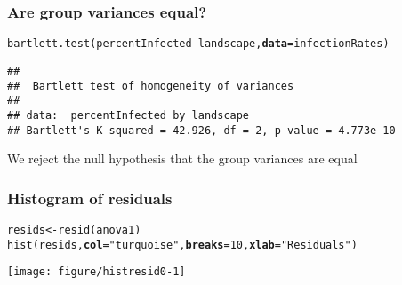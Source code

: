 \documentclass[color=usenames,dvipsnames]{beamer}\usepackage[]{graphicx}\usepackage[]{color}
\makeatletter
\newcommand{\hlnum}[1]{\textcolor[rgb]{0.69,0.494,0}{#1}}%
\newcommand{\hlstr}[1]{\textcolor[rgb]{0.749,0.012,0.012}{#1}}%
\newcommand{\hlopt}[1]{\textcolor[rgb]{0,0,0}{#1}}%
\newcommand{\hlstd}[1]{\textcolor[rgb]{0,0,0}{#1}}%
\newcommand{\hlkwb}[1]{\textcolor[rgb]{0,0.341,0.682}{#1}}%
\newcommand{\hlkwc}[1]{\textcolor[rgb]{0,0,0}{\textbf{#1}}}%
\newcommand{\hlkwd}[1]{\textcolor[rgb]{0.004,0.004,0.506}{#1}}%
\newenvironment{kframe}{%
 \def\at@end@of@kframe{}%
 \ifinner\ifhmode%
  \def\at@end@of@kframe{\end{minipage}}%
  \begin{minipage}{\columnwidth}%
 \fi\fi%
 \def\FrameCommand##1{\hskip\@totalleftmargin \hskip-\fboxsep
 \colorbox{shadecolor}{##1}\hskip-\fboxsep
     \hskip-\linewidth \hskip-\@totalleftmargin \hskip\columnwidth}%
 \MakeFramed {\advance\hsize-\width
   \@totalleftmargin\z@ \linewidth\hsize
   \@setminipage}}%
 {\par\unskip\endMakeFramed%
 \at@end@of@kframe}
\newenvironment{knitrout}{}{} %
\makeatother
\begin{document}
\begin{frame}[fragile]
  \frametitle{Are group variances equal?}
  \small
\begin{knitrout}\footnotesize
{}\color{fgcolor}\begin{kframe}
\begin{alltt}
\hlkwd{bartlett.test}\hlstd{(percentInfected}\hlopt{~}\hlstd{landscape,} \hlkwc{data}\hlstd{=infectionRates)}
\end{alltt}
\begin{verbatim}
## 
## 	Bartlett test of homogeneity of variances
## 
## data:  percentInfected by landscape
## Bartlett's K-squared = 42.926, df = 2, p-value = 4.773e-10
\end{verbatim}
\end{kframe}
\end{knitrout}
\vfill
{We reject the null hypothesis that the group variances are equal}
\end{frame}






\begin{frame}[fragile]
  \frametitle{Histogram of residuals}
\scriptsize
\begin{knitrout}
\color{fgcolor}\begin{kframe}
\begin{alltt}
\hlstd{resids} \hlkwb{<-} \hlkwd{resid}\hlstd{(anova1)}
\hlkwd{hist}\hlstd{(resids,} \hlkwc{col}\hlstd{=}\hlstr{"turquoise"}\hlstd{,} \hlkwc{breaks}\hlstd{=}\hlnum{10}\hlstd{,} \hlkwc{xlab}\hlstd{=}\hlstr{"Residuals"}\hlstd{)}
\end{alltt}
\end{kframe}
\end{knitrout}
\centering
\texttt{[image: figure/histresid0-1]} \\
\end{frame}
\end{document}
